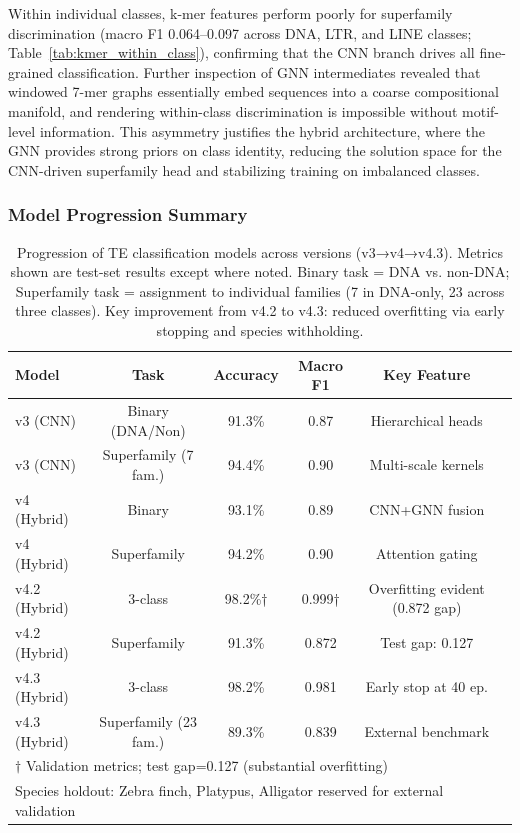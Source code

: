 \documentclass[12pt]{article}
\begin{document}
Within individual classes, k-mer features perform poorly for superfamily discrimination (macro F1 0.064--0.097 across DNA, LTR, and LINE classes; Table~\ref{tab:kmer_within_class}), confirming that the CNN branch drives all fine-grained classification. Further inspection of GNN intermediates revealed that windowed 7-mer graphs essentially embed sequences into a coarse compositional manifold, and rendering within-class discrimination is impossible without motif-level information. This asymmetry justifies the hybrid architecture, where the GNN provides strong priors on class identity, reducing the solution space for the CNN-driven superfamily head and stabilizing training on imbalanced classes.


\iffalse

\clearpage
\subsubsection{Model Progression Summary}

\FloatBarrier
\begin{table}[H]
\centering
\begin{tabular}{lccccc}
\hline
Model & Task & Accuracy & Macro F1 & Key Feature \\
\hline
v3 (CNN) & Binary (DNA/Non) & 91.3\% & 0.87 & Hierarchical heads \\
v3 (CNN) & Superfamily (7 fam.) & 94.4\% & 0.90 & Multi-scale kernels \\
v4 (Hybrid) & Binary & 93.1\% & 0.89 & CNN+GNN fusion \\
v4 (Hybrid) & Superfamily & 94.2\% & 0.90 & Attention gating \\
v4.2 (Hybrid) & 3-class & 98.2\%† & 0.999†  & Overfitting evident (0.872 gap) \\
v4.2 (Hybrid) & Superfamily & 91.3\% & 0.872 & Test gap: 0.127 \\
v4.3 (Hybrid) & 3-class & 98.2\% & 0.981 &  Early stop at 40 ep. \\
v4.3 (Hybrid) & Superfamily (23 fam.) & 89.3\% & 0.839 & External benchmark \\
\hline
\multicolumn{6}{l}{$\dagger$ Validation metrics; test gap=0.127 (substantial overfitting)} \\
\multicolumn{6}{l}{Species holdout: Zebra finch, Platypus, Alligator reserved for external validation}
\end{tabular}
\caption{Progression of TE classification models across versions (v3→v4→v4.3). Metrics shown are test-set results except where noted. Binary task = DNA vs. non-DNA; Superfamily task = assignment to individual families (7 in DNA-only, 23 across three classes). Key improvement from v4.2 to v4.3: reduced overfitting via early stopping and species withholding.}
\label{tab:model\_progression}
\end{table}
\end{document}
